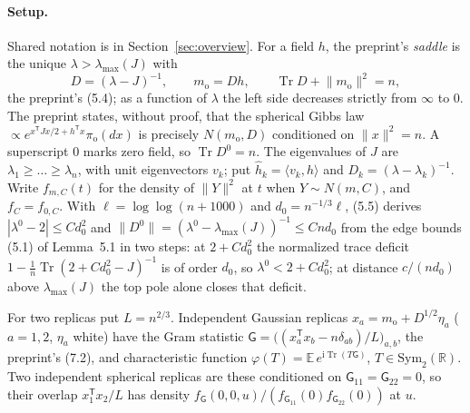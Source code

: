 \documentclass[11pt]{article}
\newcommand{\R}{\mathbb{R}}
\newcommand{\E}{\mathbb{E}}
\DeclareMathOperator{\Tr}{Tr}
\newcommand{\norm}[1]{\lVert #1\rVert}
\newcommand{\ip}[2]{\langle #1,#2\rangle}
\newcommand{\ploc}[2]{#1}
\begin{document}
\paragraph{Setup.}
Shared notation is in Section~\ref{sec:overview}. For a field $h$, the
preprint's \emph{saddle} is the unique $\lambda>\lambda_{\max}(J)$ with
\[
 D=(\lambda-J)^{-1},\qquad m_{\mathrm o}=Dh,\qquad \Tr D+\norm{m_{\mathrm o}}^2=n,
\]
the preprint's \ploc{(5.4)}{profile-spectral.tex:367--377}; as a function of
$\lambda$ the left side decreases strictly from $\infty$ to $0$. The preprint states, without proof, that
the spherical Gibbs law
$\propto e^{x^{\mathsf T}Jx/2+h^{\mathsf T}x}\pi_{\mathrm o}(dx)$ is
precisely $N(m_{\mathrm o},D)$ conditioned on $\norm x^2=n$. A superscript
$0$ marks zero field, so $\Tr D^0=n$. The eigenvalues of $J$ are
$\lambda_1\ge\dots\ge\lambda_n$, with unit eigenvectors $v_k$; put
$\hat h_k=\ip{v_k}{h}$ and $D_k=(\lambda-\lambda_k)^{-1}$. Write $f_{m,C}(t)$ for the density
of $\norm Y^2$ at $t$ when $Y\sim N(m,C)$, and $f_C=f_{0,C}$. With
$\ell=\log\log(n+1000)$ and $d_0=n^{-1/3}\ell$,
\ploc{(5.5)}{profile-spectral.tex:379--386} derives $|\lambda^0-2|\le Cd_0^2$
and $\norm{D^0}=(\lambda^0-\lambda_{\max}(J))^{-1}\le Cnd_0$ from the edge
bounds \ploc{(5.1) of Lemma~5.1}{profile-spectral.tex:89--106} in two steps:
at $2+Cd_0^2$ the normalized trace deficit $1-\frac1n\Tr(2+Cd_0^2-J)^{-1}$ is of order
$d_0$, so $\lambda^0<2+Cd_0^2$; at distance $c/(nd_0)$ above
$\lambda_{\max}(J)$ the top pole alone closes that deficit.

For two replicas put $L=n^{2/3}$. Independent Gaussian replicas
$x_a=m_{\mathrm o}+D^{1/2}\eta_a$ ($a=1,2$, $\eta_a$ white) have the Gram
statistic $\mathsf G=\bigl((x_a^{\mathsf T}x_b-n\delta_{ab})/L\bigr)_{a,b}$,
the preprint's \ploc{(7.2)}{profile-spectral.tex:1184--1193}, and
characteristic function $\varphi(T)=\E\,e^{\mathrm i\Tr(T\mathsf G)}$,
$T\in\mathrm{Sym}_2(\R)$. Two independent spherical replicas are these
conditioned on $\mathsf G_{11}=\mathsf G_{22}=0$, so their overlap
$x_1^{\mathsf T}x_2/L$ has density
$f_{\mathsf G}(0,0,u)/(f_{\mathsf G_{11}}(0)f_{\mathsf G_{22}}(0))$ at $u$.
\end{document}
